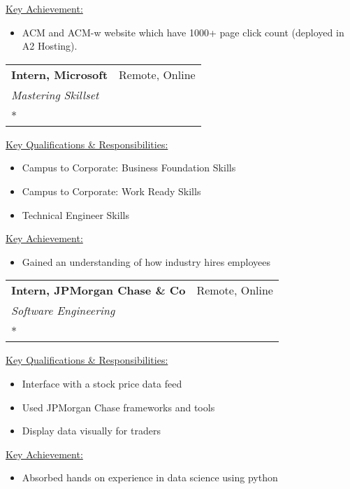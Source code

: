 \documentclass[letterpaper,11pt]{article}
\makeatletter
\newcommand{\resumeSubheading}[4]{
  \vspace{-1pt}\item
    \begin{tabular*}{0.97\textwidth}{l@{\extracolsep{\fill}}r}
      \textbf{#1} & #2 \\
      \textit{\small#3} & \textit{\small #4} \\
    \end{tabular*}\vspace{-5pt}
}
\makeatother
\begin{document}
        \hspace{1cm}\underline{Key Achievement:}
        \begin{itemize}
            \item ACM and ACM-w website which have 1000+ page click count (deployed in A2 Hosting).
        \end{itemize}
        
        
    \resumeSubheading
      {Intern, Microsoft}{Remote, Online}
      {Mastering Skillset} {July 2020 - August 2020 \\* } 
      
        \vspace{1mm}\hspace{1cm}\underline{Key Qualifications \& Responsibilities:}
          \begin{itemize}
              \item Campus to Corporate: Business Foundation Skills
              \item Campus to Corporate: Work Ready Skills
              \item Technical Engineer Skills
          \end{itemize}
          
        \hspace{1cm}\underline{Key Achievement:}
        \begin{itemize}
            \item Gained an understanding of how industry hires employees
        \end{itemize}
        
    \resumeSubheading
      {Intern, JPMorgan Chase \& Co}{Remote, Online}
      {Software Engineering} {December 2020 - January 2021 \\* } 
      
        \vspace{1mm}\hspace{1cm}\underline{Key Qualifications \& Responsibilities:}
          \begin{itemize}
              \item Interface with a stock price data feed
              \item Used JPMorgan Chase frameworks and tools 
              \item Display data visually for traders
          \end{itemize}
          
        \hspace{1cm}\underline{Key Achievement:}
        \begin{itemize}
            \item Absorbed hands on experience in data science using python
        \end{itemize}
        
\end{document}
